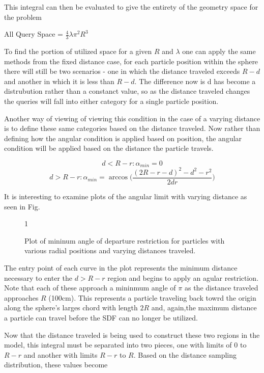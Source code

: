 This integral can then be evaluated to give the entirety of the geometry space
for the problem

\begin{center}
All Query Space = $\frac{4}{3} \lambda \pi^2 R^3$
\end{center}

To find the portion of utilized space for a given $R$ and $\lambda$ one can
apply the same methods from the fixed distance case, for each particle position
within the sphere there will still be two scenarios - one in which the distance
traveled exceeds $R-d$ and another in which it is less than $R-d$. The difference
now is d has become a distrubution rather than a constanct value, so as the
distance traveled changes the queries will fall into either category for a
single particle position.


Another way of viewing of viewing this condition in the case of a varying
distance is to define these same categories based on the distance traveled. Now
rather than defining how the angular condition is applied based on position, the
angular condition will be applied based on the distance the particle travels.


$$ d < R-r : \alpha_{min} = 0 $$
$$ d > R-r : \alpha_{min} = \arccos\Bigg ( \frac{(2R-r-d)^2-d^2-r^2}{2 d r} \Bigg
) $$

It is interesting to examine plots of the angular limit with varying distance as
seen in Fig. \label{fig:alpha_min}

\begin{figure}[ht] \label{fig:alpha_min}

\centering
{1\textwidth}
\caption{Plot of mininum angle of departure restriction for particles with
various radial positions and varying distances traveled.}
\end{figure}

The entry point of each curve in the plot represents the minimum distance
necessary to enter the $d > R-r$ region and begins to apply an agular
restriction. Note that each of these approach a mininmum angle of $\pi$ as the
distance traveled approaches $R$ (100cm). This represents a particle traveling
back towrd the origin along the sphere's larges chord with length $2R$ and,
again,the maximum distance a particle can travel before the SDF can no longer be
utilized.

Now that the distance traveled is being used to construct these two regions in
the model, this integral must be separated into two pieces, one with limits of $0$
to $R-r$ and another with limits $R-r$ to $R$. Based on the distance sampling
distribution, these values become

